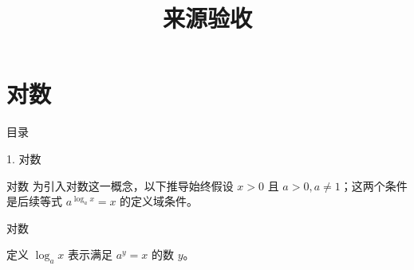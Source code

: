 \documentclass[aspectratio=169,10pt,fontset=fandol]{ctexbeamer}
\title{来源验收}
\begin{document}
\section{对数}
\begin{frame}[t,fragile]{目录}
\normalsize
{\color{blue}\normalsize 1. 对数\par}\vspace{0.3em}
\end{frame}
\begin{frame}[t,fragile]{对数}
\normalsize
{\normalsize
为引入对数这一概念，以下推导始终假设 $x>0$ 且 $a>0,a\ne1$；这两个条件是后续等式 $a^{\log_a x}=x$ 的定义域条件。
}
\end{frame}
\begin{frame}[t,fragile]{对数}
\normalsize
\begin{block}{定义}
{\normalsize
$\log_a x$ 表示满足 $a^y=x$ 的数 $y$。
}
\end{block}
\end{frame}
\end{document}
